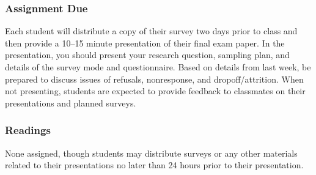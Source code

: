 \documentclass[12pt,a4paper]{article}
\begin{document}
\subsubsection*{Assignment Due}
Each student will distribute a copy of their survey two days prior to class and then provide a 10--15 minute presentation of their final exam paper. In the presentation, you should present your research question, sampling plan, and details of the survey mode and questionnaire. Based on details from last week, be prepared to discuss issues of refusals, nonresponse, and dropoff/attrition. When not presenting, students are expected to provide feedback to classmates on their presentations and planned surveys.

\subsubsection*{Readings}
None assigned, though students may distribute surveys or any other materials related to their presentations no later than 24 hours prior to their presentation.




\end{document}
